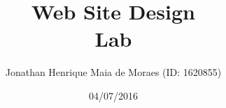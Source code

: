 \title{Web Site Design \\ Lab}
\author{Jonathan Henrique Maia de Moraes (ID: 1620855)}
\date{04/07/2016}
\maketitle
